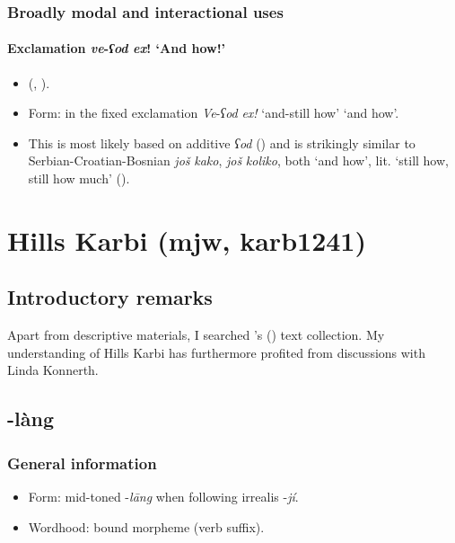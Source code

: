 \subsubsection{Broadly modal and interactional uses}
\paragraph{Exclamation \textit{ve}-\textit{ʕod} \textit{ex}! \lq And how!\rq{}}\label{appendixHebrewOdAndHow}
\begin{itemize}
	\item \citeauthor{Glinert1976} (\citeyear{Glinert1976}, \citeyear[282]{Glinert1989}).
	\item Form: in the fixed exclamation \textit{Ve}-\textit{ʕod} \textit{ex!} \lq and-still how\rq{ }\lq and how\rq{}.
	\item This is most likely based on additive \textit{ʕod} () and is strikingly similar to Serbian-Croatian-Bosnian \textit{još} \textit{kako}, \textit{još} \textit{koliko}, both \lq and how\rq{}, lit. \lq{}still how, still how much\rq{ }().
\end{itemize}

\section{Hills Karbi (mjw, karb1241)}
\label{appendixHillsKarbi}

\subsection{Introductory remarks}
Apart from descriptive materials, I searched \citeauthor{KonnerthTisso2018}'s (\citeyear{KonnerthTisso2018}) text collection. My understanding of Hills Karbi has furthermore profited from discussions with Linda Konnerth.

\subsection{-làng}

\subsubsection{General information}
\begin{itemize}
	\item Form: mid-toned \mbox{-\textit{lāng}} when following irrealis \mbox{-\textit{jí}}.
	\item Wordhood: bound morpheme (verb suffix).
\end{itemize}


